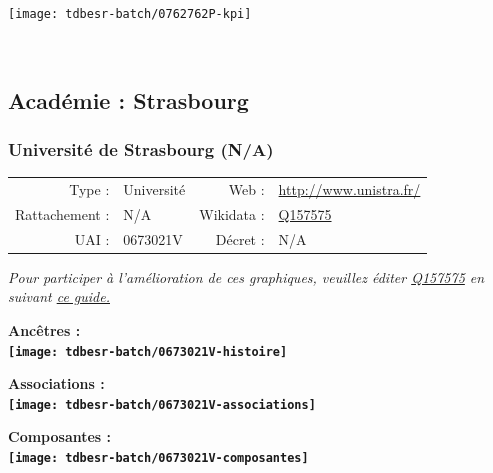 \documentclass[12pt,french,]{article}
\begin{document}
\begin{center}\texttt{[image: tdbesr-batch/0762762P-kpi]} \end{center}\checkoddpage

\ifoddpage \fi ~\newpage  

\hypertarget{acaduxe9mie-strasbourg}{%
\subsection{Académie : Strasbourg}\label{acaduxe9mie-strasbourg}}

\hypertarget{universituxe9-de-strasbourg-na}{%
\subsubsection{Université de Strasbourg
(N/A)}\label{universituxe9-de-strasbourg-na}}

\begin{tabular*}{\textwidth}{rp{5cm}rl}  
\hline  
Type : & Université & Web : &\href{http://www.unistra.fr/}{http://www.unistra.fr/} \\  
Rattachement : & N/A & Wikidata : & \href{https://www.wikidata.org/entity/Q157575}{Q157575} \\  
UAI : & 0673021V & Décret : & N/A \\  
\hline  
\end{tabular*}

\textit{\scriptsize Pour participer à l'amélioration de ces graphiques, veuillez éditer  \href{https://www.wikidata.org/entity/Q157575}{Q157575}  en suivant \href{https://github.com/cpesr/wikidataESR/blob/master/Rmd/wikidataESR.md}{ce guide.}}

\vspace{1cm}  
\begin{minipage}[b]{0.50\textwidth}\begin{center} \bf Ancêtres : \\  
\texttt{[image: tdbesr-batch/0673021V-histoire]} \end{center}\end{minipage}\begin{minipage}[b]{0.50\textwidth}\begin{center} \bf Associations : \\  
\texttt{[image: tdbesr-batch/0673021V-associations]} \end{center}\end{minipage}

\hrulefill

\begin{center} \bf Composantes : \\  
\texttt{[image: tdbesr-batch/0673021V-composantes]} \end{center}
\end{document}

